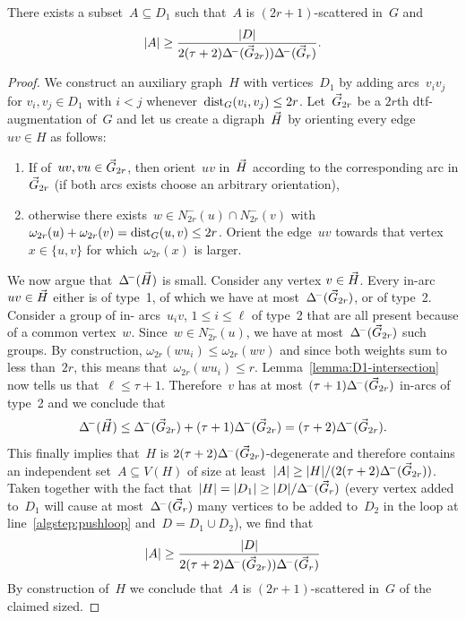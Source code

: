 \begin{lemma}
  There exists a subset~$A \subseteq D_1$ such that~$A$ is
  $(2r+1)$-scattered in~$G$ and
  \[
  	|A| \geq \frac{|D|}{2(\tau+2)\Delta^{\!-}(\vec{G}_{2r}))\Delta^{\!-}(\vec{G}_r)}.
  \]
\end{lemma}
\begin{proof}
  We construct an auxiliary graph~$H$ with vertices~$D_1$ by
  adding arcs~$v_iv_j$ for $v_i,v_j \in D_1$ with $i < j$
  whenever~$\text{dist}_G(v_i,v_j) \leq 2r$.
  Let~$\vec{G}_{2r}$ be a $2r$th dtf-augmentation of~$G$ and
  let us create a digraph~$\vec{H}$ by orienting
  every edge~$uv \in H$ as follows:
  \begin{enumerate}
    \item If of~$uv,vu \in \vec{G}_{2r}$,
          then orient~$uv$ in~$\vec{H}$ according to the corresponding
          arc in $\vec{G}_{2r}$ (if both arcs exists choose an arbitrary
          orientation),
    \item otherwise there exists~$w \in N^-_{2r}(u) \cap N^-_{2r}(v)$
          with~$\omega_{2r}(u) + \omega_{2r}(v) = \text{dist}_G(u,v) \leq 2r$. Orient the edge~$uv$ towards that vertex~$x \in \{u,v\}$
          for which~$\omega_{2r}(x)$ is larger.
  \end{enumerate}
  We now argue that~$\Delta^{\!-}(\vec{H})$ is small. Consider any vertex $v \in
  \vec{H}$. Every in-arc $uv \in \vec{H}$ either is of type~1, of which we have
  at most~$\Delta^{\!-}(\vec{G}_{2r})$, or of type~2. Consider a group of in-
  arcs~$u_iv$, $1 \leq i \leq \ell$ of type~2 that are all present because of
  a common vertex~$w$. Since~$w \in N^-_{2r}(u)$, we have at
  most~$\Delta^{\!-}(\vec{G}_{2r})$ such groups. By construction,
  $\omega_{2r}(wu_i) \leq \omega_{2r}(wv)$ and since both weights sum to less
  than~$2r$, this means that~$\omega_{2r}(wu_i) \leq r$.
  Lemma~\ref{lemma:D1-intersection} now tells us that~$\ell \leq \tau + 1$.
  Therefore~$v$ has at most~$(\tau+1) \Delta^{\!-}(\vec{G}_{2r})$ in-arcs of type~2 and we conclude that
  \[
    \Delta^{\!-}(\vec{H}) \leq \Delta^{\!-}(\vec{G}_{2r}) + (\tau+1)\Delta^{\!-}(\vec{G}_{2r}) = (\tau+2)\Delta^{\!-}(\vec{G}_{2r}).
  \]
  This finally implies that~$H$ is $2(\tau+2)\Delta^{\!-}(\vec{G}_{2r})$-degenerate and therefore contains an independent set~$A \subseteq V(H)$
  of size at least~$|A| \geq |H| / (2(\tau+2)\Delta^{\!-}(\vec{G}_{2r}))$.
  Taken together with the fact that~$|H| = |D_1| \geq |D| / \Delta^{\!-}(\vec{G}_r)$
  (every vertex added to~$D_1$ will cause at most~$\Delta^{\!-}(\vec{G}_r)$ many
  vertices to be added to~$D_2$ in the loop at line~\ref{algstep:pushloop}
  and~$D = D_1 \cup D_2$), we find that
  \[
  	|A| \geq \frac{|D|}{2(\tau+2)\Delta^{\!-}(\vec{G}_{2r}))\Delta^{\!-}(\vec{G}_r)}
  \]
  By construction of~$H$ we conclude that~$A$ is $(2r+1)$-scattered
  in~$G$ of the claimed sized.
\end{proof}

